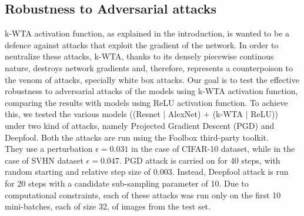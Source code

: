 \documentclass[a4paper]{article}
\begin{document}
	\subsection{Robustness to Adversarial attacks}
	k-WTA activation function, as explained in the introduction, is wanted to be a defence against attacks that exploit the gradient of the network. In order to neutralize these attacks, k-WTA, thanks to its densely piecewise continous nature, destroys network gradients and, therefore, represents a counterpoison to the venom of attacks, specially white box attacks. Our goal is to test the effective robustness to adversarial attacks of the models using k-WTA activation function, comparing the results with models using ReLU activation function. To achieve this, we tested the various models ((Resnet | AlexNet) + (k-WTA | ReLU)) under two kind of attacks, namely Projected Gradient Descent (PGD) and Deepfool. Both the attacks are run using the Foolbox third-party toolkit.\\
	They use a perturbation $\epsilon = 0.031$ in the case of CIFAR-10 dataset, while in the case of SVHN dataset $\epsilon = 0.047$. PGD attack is carried on for 40 steps, with random starting and relative step size of $0.003$. Instead, Deepfool attack is run for 20 steps with a candidate sub-sampling parameter of 10. Due to computational constraints, each of these attacks was run only on the first 10 mini-batches, each of size 32, of images from the test set.
	
\end{document}
